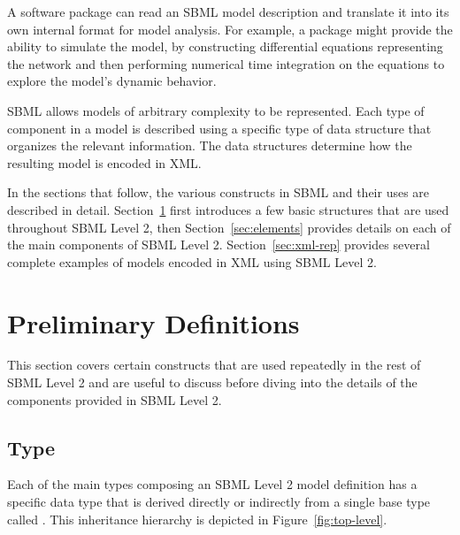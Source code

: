 \documentclass[10pt]{cekarticle}
\newcommand{\vref}[1]{\ref{#1}}
\begin{document}
A software package can read an SBML model description and translate it
into its own internal format for model analysis.  For example, a package
might provide the ability to simulate the model, by constructing
differential equations representing the network and then performing
numerical time integration on the equations to explore the model's dynamic
behavior.

SBML allows models of arbitrary complexity to be represented.  Each type of
component in a model is described using a specific type of data structure
that organizes the relevant information.  The data structures determine how
the resulting model is encoded in XML.

In the sections that follow, the various constructs in SBML and
their uses are described in detail.  Section~\ref{sec:general}
first introduces a few basic structures that are used throughout
SBML Level 2, then Section~\ref{sec:elements} provides details on
each of the main components of SBML Level 2.
Section~\ref{sec:xml-rep} provides several complete examples of
models encoded in XML using SBML Level 2.

\section{Preliminary Definitions}
\label{sec:general}

This section covers certain constructs that are used repeatedly in
the rest of SBML Level 2 and are useful to discuss before diving
into the details of the components provided in SBML Level 2.

\subsection{Type }
\label{sec:sbase}

Each of the main types composing an SBML Level 2 model definition
has a specific data type that is derived directly or indirectly
from a single base type called .  This inheritance
hierarchy is depicted in Figure~\vref{fig:top-level}.
\end{document}
